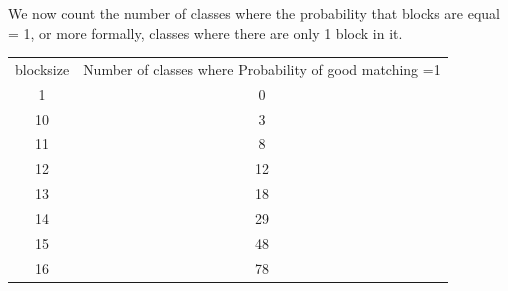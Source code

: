 \documentclass{article}
\begin{document}
We now count the number of classes where the probability that blocks are equal = 1, or more formally, classes where there are only 1 block in it.\\
\begin{center}
\begin{tabular}{|c|c|}
  \hline
  blocksize & Number of classes where Probability of good matching =1\\
	1 & 0\\
	10 & 3\\
	11 & 8\\
	12 & 12\\
	13 & 18\\
	14 & 29\\
	15 & 48\\
	16 & 78\\
	\hline
\end{tabular}
\end{center}
\end{document}

